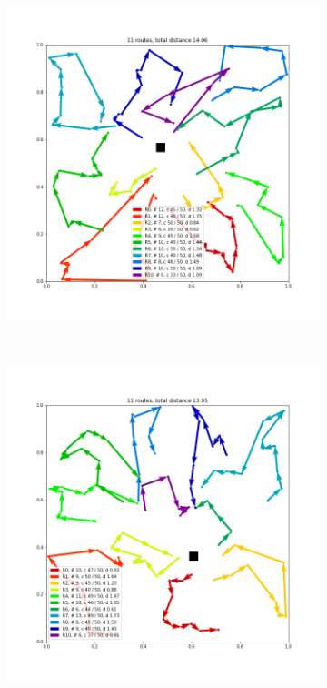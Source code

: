 \begin{figure}
    \centering
    \begin{subfigure}[b]{0.49\linewidth}
        \centerline{\includegraphics[trim={50 70 50 50},clip,width=\linewidth]{./images/cvrp_0}}
\caption{}
    \end{subfigure}
    ~
    \begin{subfigure}[b]{0.49\linewidth}
        \centerline{\includegraphics[trim={50 70 50 50},clip,width=\linewidth]{./images/cvrp_1}}
\caption{}
    \end{subfigure}
    

\end{figure}
